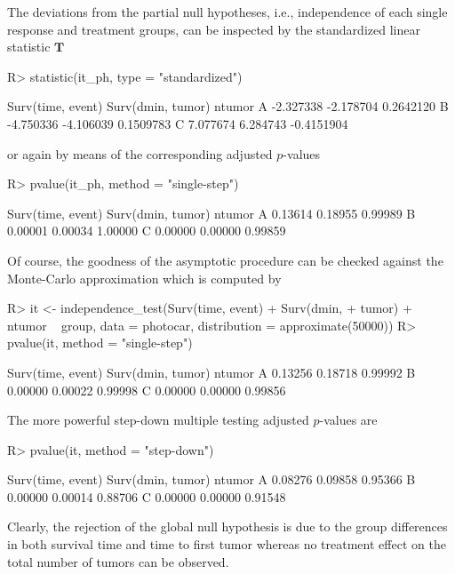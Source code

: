\documentclass{article}
\newcommand{\T}{\mathbf{T}}
\newenvironment{Schunk}{}{}
\begin{document}
The deviations from the partial null hypotheses, i.e., independence of
each single response and treatment groups, can be inspected by the standardized
linear statistic $\T$
\begin{Schunk}
\begin{Sinput}
R> statistic(it_ph, type = "standardized")
\end{Sinput}
\begin{Soutput}
  Surv(time, event) Surv(dmin, tumor)     ntumor
A         -2.327338         -2.178704  0.2642120
B         -4.750336         -4.106039  0.1509783
C          7.077674          6.284743 -0.4151904
\end{Soutput}
\end{Schunk}
or again by means of the corresponding adjusted $p$-values
\begin{Schunk}
\begin{Sinput}
R> pvalue(it_ph, method = "single-step")
\end{Sinput}
\end{Schunk}
\begin{Schunk}
\begin{Soutput}
  Surv(time, event) Surv(dmin, tumor)  ntumor
A           0.13614           0.18955 0.99989
B           0.00001           0.00034 1.00000
C           0.00000           0.00000 0.99859
\end{Soutput}
\end{Schunk}
Of course, the goodness of the asymptotic procedure can be checked against
the Monte-Carlo approximation which is computed by
\begin{Schunk}
\begin{Sinput}
R> it <- independence_test(Surv(time, event) + Surv(dmin, 
+     tumor) + ntumor ~ group, data = photocar, distribution = approximate(50000))
R> pvalue(it, method = "single-step")
\end{Sinput}
\begin{Soutput}
  Surv(time, event) Surv(dmin, tumor)  ntumor
A           0.13256           0.18718 0.99992
B           0.00000           0.00022 0.99998
C           0.00000           0.00000 0.99856
\end{Soutput}
\end{Schunk}
The more powerful step-down multiple testing adjusted $p$-values 
\citep[Algorithm 2.8 in][]{WestfallYoung1993} are 
\begin{Schunk}
\begin{Sinput}
R> pvalue(it, method = "step-down")
\end{Sinput}
\begin{Soutput}
  Surv(time, event) Surv(dmin, tumor)  ntumor
A           0.08276           0.09858 0.95366
B           0.00000           0.00014 0.88706
C           0.00000           0.00000 0.91548
\end{Soutput}
\end{Schunk}
Clearly, the rejection of the global null hypothesis is due to the
group differences in both survival time and time to first tumor whereas 
no treatment effect on the total number of tumors can be observed.
\end{document}

